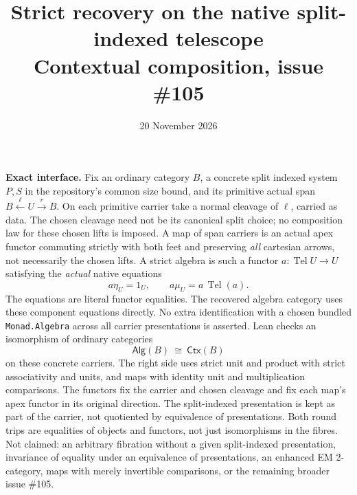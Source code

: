 \documentclass[11pt]{article}
\title{Strict recovery on the native split-indexed telescope\\\large Contextual composition, issue \#105}
\author{}
\date{20 November 2026}
\newcommand{\Tel}{\operatorname{Tel}}
\newcommand{\CC}{\mathsf{Ctx}}
\newcommand{\AA}{\mathsf{Alg}}
\begin{document}
\maketitle
\noindent\textbf{Exact interface.}
Fix an ordinary category \(B\), a concrete split indexed system \(P,S\) in the repository's common size bound, and its primitive actual span
\(B\xleftarrow{\ell} U\xrightarrow{r}B\).
On each primitive carrier take a normal cleavage of \(\ell\), carried as data. The chosen cleavage need not be its canonical split choice; no composition law for these chosen lifts is imposed. A map of span carriers is an actual apex functor commuting strictly with both feet and preserving \emph{all} cartesian arrows, not necessarily the chosen lifts. A strict algebra is such a functor \(a:\Tel U\to U\) satisfying the \emph{actual} native equations
\[
  a\eta_U=1_U,\qquad a\mu_U=a\,\Tel(a).
\]
The equations are literal functor equalities. The recovered algebra category uses these component equations directly. No extra identification with a chosen bundled \texttt{Monad.Algebra} across all carrier presentations is asserted. Lean checks an isomorphism of ordinary categories
\[
  \AA(B)\ \cong\ \CC(B)
\]
on these concrete carriers. The right side uses strict unit and product with strict associativity and units, and maps with identity unit and multiplication comparisons. The functors fix the carrier and chosen cleavage and fix each map's apex functor in its original direction. The split-indexed presentation is kept as part of the carrier, not quotiented by equivalence of presentations. Both round trips are equalities of objects and functors, not just isomorphisms in the fibres. Not claimed: an arbitrary fibration without a given split-indexed presentation, invariance of equality under an equivalence of presentations, an enhanced EM 2-category, maps with merely invertible comparisons, or the remaining broader issue \#105.
\end{document}
